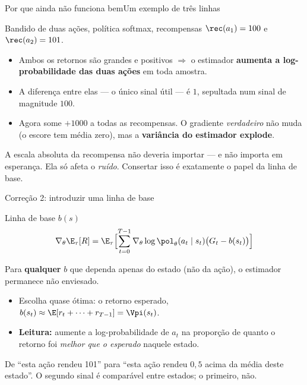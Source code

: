 \documentclass[aspectratio=169, 11pt]{beamer}
\newcommand{\thv}{\theta}                       %
\newcommand{\polth}{\pol_{\thv}}                %
\newcommand{\gth}{\nabla_{\thv}}                %
\newcommand{\traj}{\tau}                        %
\begin{document}
\begin{frame}{Por que ainda não funciona bem}{Um exemplo de três linhas}

  Bandido de duas ações, política softmax, recompensas
  $\rec(a_1) = 100$ e $\rec(a_2) = 101$.

  \begin{itemize}\setlength{\itemsep}{0.35ex}
    \item Ambos os retornos são grandes e positivos $\Rightarrow$ o estimador
      \textbf{aumenta a log-probabilidade das duas ações} em toda amostra.
    \item A diferença entre elas --- o único sinal útil --- é $1$, sepultada
      num sinal de magnitude $100$.
    \item Agora some $+1000$ a todas as recompensas. O gradiente
      \emph{verdadeiro} não muda (o escore tem média zero), mas a
      \textbf{variância do estimador explode}.
  \end{itemize}

  \begin{ideiabox}
    A escala absoluta da recompensa não deveria importar --- e não importa em
    esperança. Ela só afeta o \emph{ruído}. Consertar isso é exatamente o
    papel da linha de base.
  \end{ideiabox}
\end{frame}

\begin{frame}{Correção 2: introduzir uma linha de base}

  \begin{defbox}{Linha de base $b(s)$}
    \vspace{-0.9em}
    \[
      \gth \E_{\traj}[R] = \E_{\traj}\Bigl[\sum_{t=0}^{T-1}
        \gth \log \polth(a_t\mid s_t)\bigl(G_t - b(s_t)\bigr)\Bigr]
    \]
    \vspace{-0.9em}

    Para \textbf{qualquer} $b$ que dependa apenas do estado (não da ação), o
    estimador permanece não enviesado.
  \end{defbox}

  \begin{itemize}\setlength{\itemsep}{0.35ex}
    \item Escolha quase ótima: o retorno esperado,
      $b(s_t) \approx \E[r_t + \dots + r_{T-1}] = \Vpi(s_t)$.
    \item \textbf{Leitura:} aumente a log-probabilidade de $a_t$ na proporção
      de quanto o retorno foi \emph{melhor que o esperado} naquele estado.
  \end{itemize}

  \begin{ideiabox}
    De ``esta ação rendeu 101'' para ``esta ação rendeu $0{,}5$ acima da média
    deste estado''. O segundo sinal é comparável entre estados; o primeiro, não.
  \end{ideiabox}
\end{frame}
\end{document}
